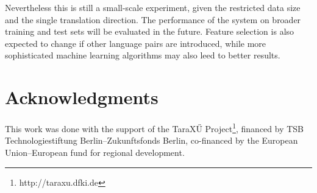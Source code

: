 \documentclass[11pt]{article}
\begin{document}
Nevertheless this is still a small-scale experiment, given the restricted data
size and the single translation direction. The performance of the system on
broader training and test sets will be evaluated in the future. Feature
selection is also expected to change if other language pairs are introduced,
while more sophisticated machine learning algorithms may also leed to better
results. 

\section*{Acknowledgments}
This work was done with the support of the TaraX\H{U}
Project\footnote{http://taraxu.dfki.de}, 
financed by TSB Technologiestiftung Berlin--Zukunftsfonds Berlin, co-financed
by the European Union--European fund for regional development.

 
 

%  
% 
% 
% 
% 
% 
\end{document}
